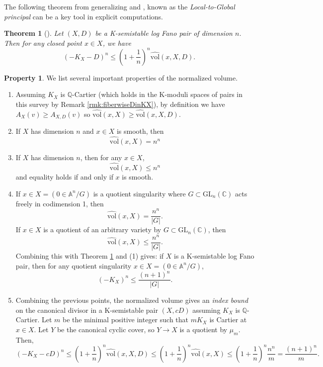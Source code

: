 \documentclass[11pt]{amsart}
\numberwithin{equation}{section}
\newtheorem{thm}[theorem]{Theorem}
\theoremstyle{definition}
\newtheorem{property}[theorem]{Property}
\newcommand{\bC}{\mathbb{C}}
\newcommand{\bQ}{\mathbb{Q}}
\newcommand{\GL}{\mathrm{GL}}
\newcommand{\hvol}{\widehat{\mathrm{vol}}}
\newcommand{\vol}{\mathrm{vol}}
\begin{document}
The following theorem from \cite{LL19} generalizing \cite[Theorem 1.1]{Fuj15} and \cite[Theorem 1.2]{Liu18}, known as the \textit{Local-to-Global principal} can be a key tool in explicit computations. 

\begin{thm}[{\cite[Proposition 4.6]{LL19}}]\label{thm:local-vol-global}
Let $(X,D)$ be a K-semistable log Fano pair of dimension $n$. Then for any closed point $x\in X$, we have 
\[
(-K_X-D)^n\leq \left(1+\frac{1}{n}\right)^n\hvol(x,X,D).
\]
\end{thm}

 

\begin{property}\label{propsofvol}
We list several important properties of the normalized volume.
\begin{enumerate}
    \item Assuming $K_X$ is $\bQ$-Cartier (which holds in the K-moduli spaces of pairs in this survey by Remark \ref{rmk:fiberwiseDinKX}), by definition we have $A_X(v) \ge A_{X,D}(v)$ so $\widehat{\vol}(x,X) \ge \widehat{\vol}(x,X,D)$.
    \item \cite{dFEM,Li18} If $X$ has dimension $n$ and $x \in X$ is smooth, then 
    \[ \widehat{\vol}(x,X) = n^n \]
    \item \cite{LXcubics} If $X$ has dimension $n$, then for any $x \in X$, \[ \widehat{\vol}(x,X) \le n^n \] and equality holds if and only if $x$ is smooth.  
    \item \cite{Liu18} If $x \in X = (0 \in \mathbb{A}^n/G)$ is a quotient singularity where $G \subset \GL_n(\bC)$ acts freely in codimension 1, then \[\widehat{\vol}(x,X) = \frac{n^n}{|G|}.\] If $x \in X$ is a quotient of an arbitrary variety by $G \subset \GL_n(\bC)$, then \[\widehat{\vol}(x,X) \le \frac{n^n}{|G|}.\] Combining this with Theorem \ref{thm:local-vol-global} and (1) gives: if $X$ is a K-semistable log Fano pair, then for any quotient singularity $x \in X = (0 \in \mathbb{A}^n/G)$, 
    \[ (-K_X)^n \le \frac{(n+1)^n}{|G|}. \]
    \item Combining the previous points, the normalized volume gives an \textit{index bound} on the canonical divisor in a K-semistable pair $(X,cD)$ assuming $K_X$ is $\bQ$-Cartier.  Let $m$ be the minimal positive integer such that $mK_X$ is Cartier at $x \in X$.  Let $Y$ be the canonical cyclic cover, so $Y \to X$ is a quotient by $\mu_m$.  Then, 
    \[ (-K_X-cD)^n \le \left( 1 + \frac{1}{n}\right)^n \widehat{\vol}(x,X,D) \le  \left( 1 + \frac{1}{n}\right)^n \widehat{\vol}(x,X) \le   \left( 1 + \frac{1}{n}\right)^n \frac{n^n}{m} = \frac{(n+1)^n}{m}. \]

\end{enumerate}
\end{property}
\end{document}
